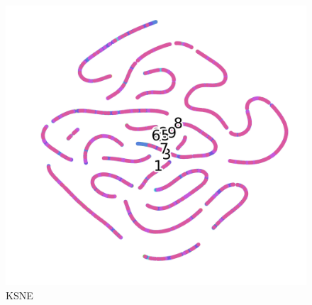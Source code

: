 \documentclass{article}
\begin{document}
\begin{figure}[!h]
  \centering
  \includegraphics[scale=0.5]{imgs/ksne.png}
  \caption{KSNE}
  \label{ksne}
\end{figure}
\end{document}
